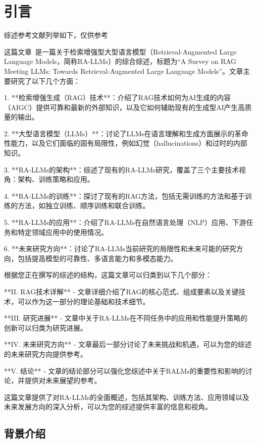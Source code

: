 \chapter{引\hspace{6pt}言}

综述参考文献列举如下，仅供参考


这篇文章~\cite{Fan2024}是一篇关于检索增强型大型语言模型（Retrieval-Augmented Large Language Models，简称RA-LLMs）的综合综述，标题为“A Survey on RAG Meeting LLMs: Towards Retrieval-Augmented Large Language Models”。文章主要研究了以下几个方面：

1. **检索增强生成（RAG）技术**：介绍了RAG技术如何为AI生成的内容（AIGC）提供可靠和最新的外部知识，以及它如何辅助现有的生成型AI产生高质量的输出。

2. **大型语言模型（LLMs）**：讨论了LLMs在语言理解和生成方面展示的革命性能力，以及它们面临的固有局限性，例如幻觉（hallucinations）和过时的内部知识。

3. **RA-LLMs的架构**：综述了现有的RA-LLMs研究，覆盖了三个主要技术视角：架构、训练策略和应用。

4. **RA-LLMs的训练**：探讨了现有的RAG方法，包括无需训练的方法和基于训练的方法，如独立训练、顺序训练和联合训练。

5. **RA-LLMs的应用**：介绍了RA-LLMs在自然语言处理（NLP）应用、下游任务和特定领域应用中的使用情况。

6. **未来研究方向**：讨论了RA-LLMs当前研究的局限性和未来可能的研究方向，包括提高模型的可靠性、多语言能力和多模态能力。

根据您正在撰写的综述的结构，这篇文章可以归类到以下几个部分：

**II. RAG技术详解**
   - 文章详细介绍了RAG的核心范式、组成要素以及关键技术，可以作为这一部分的理论基础和技术细节。

**III. 研究进展**
   - 文章中关于RA-LLMs在不同任务中的应用和性能提升策略的创新可以归类为研究进展。

**IV. 未来研究方向**
   - 文章最后一部分讨论了未来挑战和机遇，可以为您的综述的未来研究方向提供参考。

**V. 结论**
   - 文章的结论部分可以强化您综述中关于RALMs的重要性和影响的讨论，并提供对未来展望的参考。

这篇文章提供了对RA-LLMs的全面概述，包括其架构、训练方法、应用领域以及未来发展方向的深入分析，可以为您的综述提供丰富的信息和视角。


\section{背景介绍}


